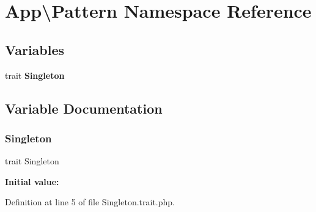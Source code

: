 \section{App\textbackslash{}Pattern Namespace Reference}
\label{namespace_app_1_1_pattern}
\subsection*{Variables}
\begin{DoxyCompactItemize}
\item 
trait \textbf{ Singleton}
\end{DoxyCompactItemize}


\subsection{Variable Documentation}
\mbox{\label{namespace_app_1_1_pattern_a90c7994df18fc2d358849f9a46502bc1}} 
\subsubsection{Singleton}
{\footnotesize\ttfamily trait Singleton}

{\bfseries Initial value\+:}


Definition at line 5 of file Singleton.\+trait.\+php.

